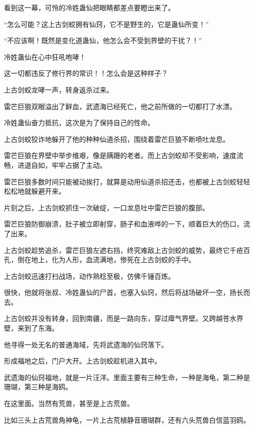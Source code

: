 
\begin{this_body}



看到这一幕，可怜的冷姓蛊仙把眼睛都差点要瞪出来了。

“怎么可能？这上古剑蛟拥有仙窍，它不是野生的，它是蛊仙所变！”

“不应该啊！既然是变化道蛊仙，他怎么会不受到界壁的干扰？！”

冷姓蛊仙在心中狂吼咆哮！

这一切都违反了修行界的常识！！怎么会是这种样子？

上古剑蛟龙哮一声，转身返杀过来。

雷芒巨狼双眼溢出了鲜血，武遗海已经死亡，他之前所做的一切都打了水漂。

冷姓蛊仙奋力抵抗，这次是为了保持自己的性命。

上古剑蛟狡诈地躲开了他的种种仙道杀招，围绕着雷芒巨狼不断喷吐龙息。

雷芒巨狼在界壁中举步维艰，像是蹒跚的老者。而上古剑蛟却不受影响，速度流畅，进退自如，牢牢占据了主动。

雷芒巨狼多数时间只能被动挨打，就算是动用仙道杀招还击，也都被上古剑蛟轻轻松松地就躲避开来。

片刻之后，上古剑蛟抓住一次破绽，一口龙息吐中雷芒巨狼的腹部。

雷芒巨狼防御崩溃，肚子被立即射穿，肠子和血液哗的一下，顺着巨大的伤口，流了出来。

上古剑蛟趁势追杀，雷芒巨狼左遮右挡，终究难敌上古剑蛟的威势，最终它千疮百孔，倒在地上，化为人形，血流满地，惨死在上古剑蛟的手中。

上古剑蛟迅速打扫战场，动作熟稔至极，仿佛千锤百炼。

很快，他就将张叔、冷姓蛊仙的尸首，也塞入仙窍，然后将战场破坏一空，扬长而去。

上古剑蛟并没有转身，回到南疆，而是一路向东，穿过瘴气界壁。又跨越苍水界壁，来到了东海。

他寻得一处无名的普通海域，先将武遗海的仙窍落下。

形成福地之后，门户大开。上古剑蛟趁机进入其中。

武遗海的仙窍福地，就是一片汪洋。里面主要有三种生命，一种是海龟，第二种是珊瑚，第三种是海鸥。

在这里面。当然有荒兽，甚至是上古荒兽。

比如三头上古荒兽角神龟，一片上古荒植静音珊瑚群，还有六头荒兽白信蓝羽鸥。


\end{this_body}
